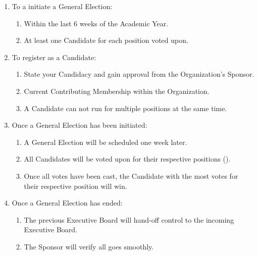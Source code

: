 \begin{enumerate}
	\item To a initiate a General Election:
		\begin{enumerate}
			\item Within the last 6 weeks of the Academic Year.

			\item At least one Candidate for each position voted upon.
		\end{enumerate}

	\item To register as a Candidate:
		\begin{enumerate}
			\item State your Candidacy and gain approval from the Organization's Sponsor.

			\item Current Contributing Membership within the Organization.

			\item A Candidate can not run for multiple positions at the same time.
		\end{enumerate}

	\item Once a General Election has been initiated:
		\begin{enumerate}
			\item A General Election will be scheduled one week later.

			\item All Candidates will be voted upon for their respective positions ().

			\item Once all votes have been cast, the Candidate with the most votes for
				their respective position will win.
		\end{enumerate}

	\item Once a General Election has ended:
		\begin{enumerate}
			\item The previous Executive Board will hand-off control to the incoming Executive
				Board.

			\item The Sponsor will verify all goes smoothly.
		\end{enumerate}
\end{enumerate}

